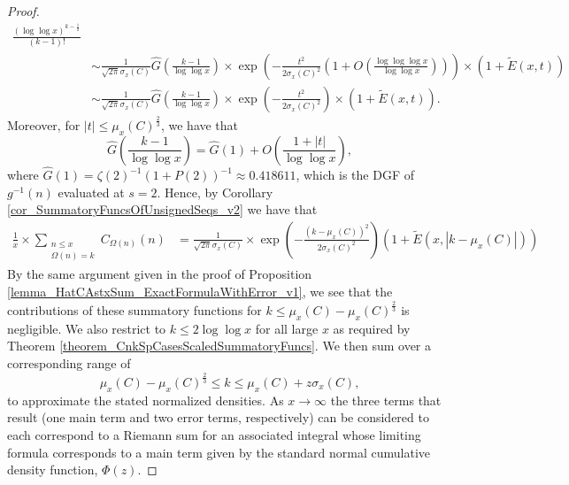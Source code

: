 \documentclass[11pt,reqno,a4letter]{article}
\numberwithin{figure}{section}
\numberwithin{table}{section}
\theoremstyle{plain}
\numberwithin{theorem}{section}
\theoremstyle{definition}
\begin{document}
\begin{proof}
\begin{align*}
     \frac{(\log\log x)^{k-\frac{1}{2}}}{(k-1)!} \\ 
     & \sim 
     \frac{1}{\sqrt{2\pi} \sigma_x(C)} \widehat{G}\left(\frac{k-1}{\log\log x}\right) 
     \times \exp\left(-\frac{t^2}{2\sigma_x(C)^2} \left(1 + O\left( 
     \frac{\log\log\log x}{\log\log x}\right)\right)\right) \times 
     \left(1 + \widetilde{E}(x, t)\right) \\ 
     & \sim \frac{1}{\sqrt{2\pi} \sigma_x(C)} \widehat{G}\left(\frac{k-1}{\log\log x}\right) 
     \times \exp\left(-\frac{t^2}{2\sigma_x(C)^2}\right) \times \left( 
     1 + \widetilde{E}(x, t)
     \right). 
\end{align*} 
Moreover, for $|t| \leq \mu_x(C)^{\frac{2}{3}}$, we have that 
\[
\widehat{G}\left(\frac{k-1}{\log\log x}\right) = \widehat{G}(1) + 
     O\left(\frac{1+|t|}{\log\log x}\right), 
\]
where $\widehat{G}(1) = \zeta(2)^{-1}(1+P(2))^{-1} \approx 0.418611$, 
which is the DGF of $g^{-1}(n)$ evaluated at $s = 2$. 
Hence, by Corollary \ref{cor_SummatoryFuncsOfUnsignedSeqs_v2} we have that 
\begin{align*}
\frac{1}{x} \times \sum_{\substack{n \leq x \\ \Omega(n)=k}} C_{\Omega(n)}(n) & = 
     \frac{1}{\sqrt{2\pi} \sigma_x(C)} \times 
     \exp\left(-\frac{(k-\mu_x(C))^2}{2\sigma_x(C)^2}\right) 
     \left(1 + \widetilde{E}\left(x, \left\lvert k - \mu_x(C) \right\rvert\right)\right) 
\end{align*}
By the same argument given in the proof of 
Proposition \ref{lemma_HatCAstxSum_ExactFormulaWithError_v1}, we see that 
the contributions of these summatory functions for 
$k \leq \mu_x(C) - \mu_x(C)^{\frac{2}{3}}$ is negligible. 
We also restrict to $k \leq 2\log\log x$ for all large $x$ as required by 
Theorem \ref{theorem_CnkSpCasesScaledSummatoryFuncs}. We then sum over a 
corresponding range of 
\[
\mu_x(C) -\mu_x(C)^{\frac{2}{3}} \leq k \leq \mu_x(C) + z \sigma_x(C), 
\] 
to approximate the stated normalized densities. 
As $x \rightarrow \infty$ the 
three terms that result (one main term and two error terms, respectively) 
can be considered to each correspond to a Riemann sum for an associated integral whose 
limiting formula corresponds to a main term given by the standard normal 
cumulative density function, $\Phi(z)$. 
\end{proof} 
\end{document}
